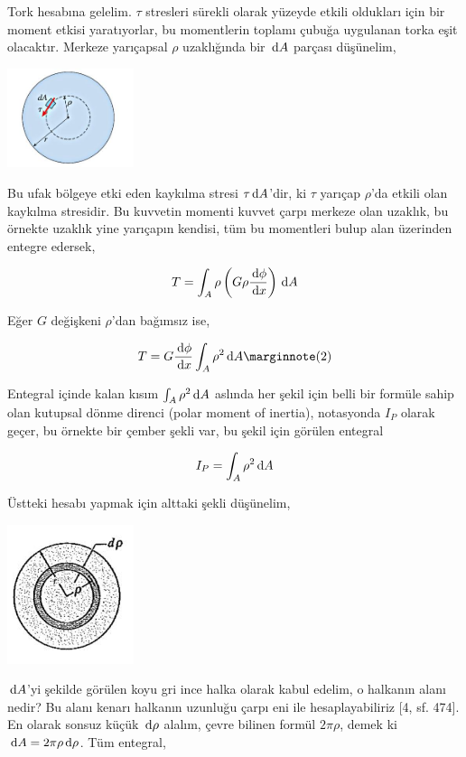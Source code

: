 \documentclass[12pt,fleqn]{article}\usepackage{../../common}
\begin{document}
Tork hesabına gelelim. $\tau$ stresleri sürekli olarak yüzeyde etkili oldukları
için bir moment etkisi yaratıyorlar, bu momentlerin toplamı çubuğa uygulanan
torka eşit olacaktır. Merkeze yarıçapsal $\rho$ uzaklığında bir $\,\mathrm{d} A$ parçası
düşünelim,

\includegraphics[width=10em]{phy_020_strs_06_04.jpg}

Bu ufak bölgeye etki eden kaykılma stresi $\tau \,\mathrm{d} A$'dir, ki $\tau$ yarıçap
$\rho$'da etkili olan kaykılma stresidir. Bu kuvvetin momenti kuvvet çarpı
merkeze olan uzaklık, bu örnekte uzaklık yine yarıçapın kendisi, tüm bu
momentleri bulup alan üzerinden entegre edersek,

$$
T = \int_A \rho \left( G \rho \frac{\,\mathrm{d} \phi}{\,\mathrm{d} x} \right) \,\mathrm{d} A
$$

Eğer $G$ değişkeni $\rho$'dan bağımsız ise, 

$$
T = G \frac{\ud \phi}{\ud x} \int_A \rho^2 \ud A
\mlabel{2}
$$

Entegral içinde kalan kısım $\int_A \rho^2 \,\mathrm{d} A$ aslında her şekil için belli
bir formüle sahip olan kutupsal dönme direnci (polar moment of inertia),
notasyonda $I_P$ olarak geçer, bu örnekte bir çember şekli var, bu şekil için
görülen entegral

$$
I_P = \int_A \rho^2 \,\mathrm{d} A
$$

Üstteki hesabı yapmak için alttaki şekli düşünelim, 

\includegraphics[width=10em]{phy_020_strs_06_05.jpg}

$\,\mathrm{d} A$'yi şekilde görülen koyu gri ince halka olarak kabul edelim, o halkanın
alanı nedir? Bu alanı kenarı halkanın uzunluğu çarpı eni ile hesaplayabiliriz
[4, sf. 474]. En olarak sonsuz küçük $\,\mathrm{d} \rho$ alalım, çevre bilinen formül
$2\pi\rho$, demek ki $\,\mathrm{d} A = 2\pi\rho \,\mathrm{d} \rho$. Tüm entegral,
\end{document}
